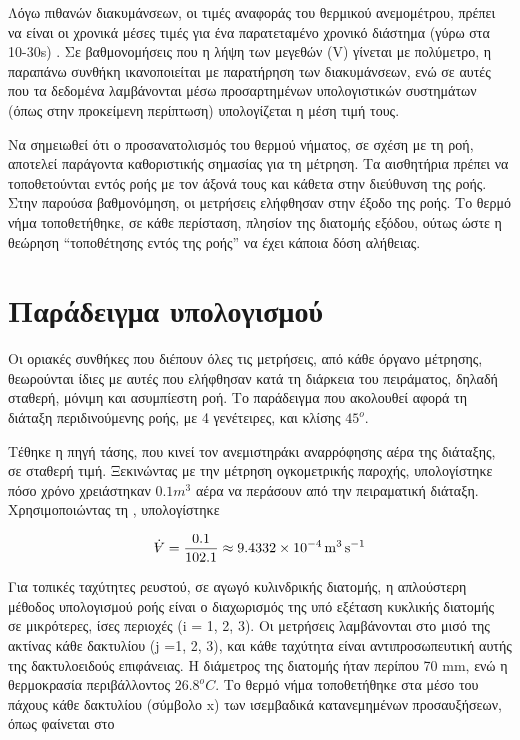 \begin{refsection}
Λόγω πιθανών διακυμάνσεων, οι τιμές αναφοράς του θερμικού ανεμομέτρου, πρέπει να είναι οι χρονικά μέσες τιμές για ένα παρατεταμένο χρονικό διάστημα (γύρω στα 10-30s) \cite{1995_Bruun_BOOK}. Σε βαθμονομήσεις που η λήψη των μεγεθών (V) γίνεται με πολύμετρο, η παραπάνω συνθήκη ικανοποιείται με παρατήρηση των διακυμάνσεων, ενώ σε αυτές που τα δεδομένα λαμβάνονται μέσω προσαρτημένων υπολογιστικών συστημάτων (όπως στην προκείμενη περίπτωση) υπολογίζεται η μέση τιμή τους.
 
Να σημειωθεί ότι ο προσανατολισμός του θερμού νήματος, σε σχέση με τη ροή, αποτελεί παράγοντα καθοριστικής σημασίας για τη μέτρηση. Τα αισθητήρια πρέπει να τοποθετούνται εντός ροής με τον άξονά τους και κάθετα στην διεύθυνση της ροής. Στην παρούσα βαθμονόμηση, οι μετρήσεις ελήφθησαν στην έξοδο της ροής. Το θερμό νήμα τοποθετήθηκε, σε κάθε περίσταση, πλησίον της διατομής εξόδου, ούτως ώστε η θεώρηση \enquote{τοποθέτησης εντός της ροής} να έχει κάποια δόση αλήθειας.

\section*{Παράδειγμα υπολογισμού}

\noindent Οι οριακές συνθήκες που διέπουν όλες τις μετρήσεις, από κάθε όργανο μέτρησης, θεωρούνται ίδιες με αυτές που ελήφθησαν κατά τη διάρκεια του πειράματος, δηλαδή σταθερή, μόνιμη και ασυμπίεστη ροή. Το παράδειγμα που ακολουθεί αφορά τη διάταξη περιδινούμενης ροής, με 4 γενέτειρες, και κλίσης $45^o$.

Τέθηκε η πηγή τάσης, που κινεί τον ανεμιστηράκι αναρρόφησης αέρα της διάταξης, σε σταθερή τιμή. Ξεκινώντας με την μέτρηση ογκομετρικής παροχής, υπολογίστηκε πόσο χρόνο χρειάστηκαν $0.1 m^3$ αέρα να περάσουν από την πειραματική διάταξη. Χρησιμοποιώντας τη , υπολογίστηκε

\begin{align*}
\dot{\volume} = \frac{0.1}{102.1} \approx \qty{9.4332d-4}{\metre\cubed\per\second} 
\end{align*}

\noindent Για τοπικές ταχύτητες ρευστού, σε αγωγό κυλινδρικής διατομής, η απλούστερη μέθοδος υπολογισμού ροής είναι ο διαχωρισμός της υπό εξέταση κυκλικής διατομής σε μικρότερες, ίσες περιοχές (i = 1, 2, 3). Οι μετρήσεις λαμβάνονται στο μισό της ακτίνας κάθε δακτυλίου (j =1, 2, 3), και κάθε ταχύτητα είναι αντιπροσωπευτική αυτής της δακτυλοειδούς επιφάνειας. Η διάμετρος της διατομής ήταν περίπου 70 mm, ενώ η θερμοκρασία περιβάλλοντος $26.8 ^oC$. 
Το θερμό νήμα τοποθετήθηκε στα μέσο του πάχους κάθε δακτυλίου (σύμβολο x) των ισεμβαδικά κατανεμημένων προσαυξήσεων, όπως φαίνεται στο 


\end{refsection}
